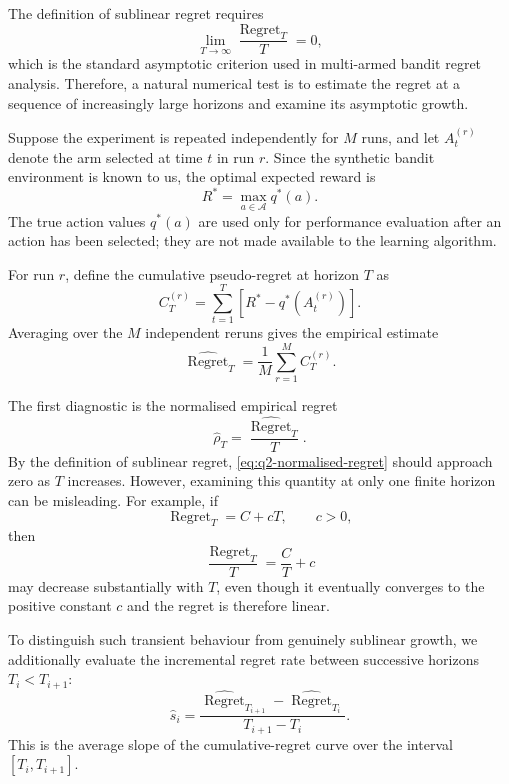 The definition of sublinear regret requires
\[
    \lim_{T\to\infty}
    \frac{\operatorname{Regret}_T}{T}
    =
    0,
\]
which is the standard asymptotic criterion used in multi-armed bandit
regret analysis. Therefore, a natural numerical
test is to estimate the regret at a sequence of increasingly large horizons
and examine its asymptotic growth.

Suppose the experiment is repeated independently for $M$ runs, and let
$A_t^{(r)}$ denote the arm selected at time $t$ in run $r$. Since the
synthetic bandit environment is known to us, the optimal expected reward is
\[
    R^\ast
    =
    \max_{a\in\mathcal A} q^\ast(a).
\]
The true action values $q^\ast(a)$ are used only for performance evaluation
after an action has been selected; they are not made available to the
learning algorithm.

For run $r$, define the cumulative pseudo-regret at horizon $T$ as
\[
    C_T^{(r)}
    =
    \sum_{t=1}^{T}
    \left[
        R^\ast-q^\ast\!\left(A_t^{(r)}\right)
    \right].
\]
Averaging over the $M$ independent reruns gives the empirical estimate
\[
    \widehat{\operatorname{Regret}}_T
    =
    \frac{1}{M}
    \sum_{r=1}^{M}
    C_T^{(r)}.
\]

The first diagnostic is the normalised empirical regret
\begin{equation}
    \widehat{\rho}_T
    =
    \frac{\widehat{\operatorname{Regret}}_T}{T}.
    \label{eq:q2-normalised-regret}
\end{equation}
By the definition of sublinear regret,
\eqref{eq:q2-normalised-regret} should approach zero as $T$ increases.
However, examining this quantity at only one finite horizon can be
misleading. For example, if
\[
    \operatorname{Regret}_T=C+cT,
    \qquad c>0,
\]
then
\[
    \frac{\operatorname{Regret}_T}{T}
    =
    \frac{C}{T}+c
\]
may decrease substantially with $T$, even though it eventually converges
to the positive constant $c$ and the regret is therefore linear.

To distinguish such transient behaviour from genuinely sublinear growth,
we additionally evaluate the incremental regret rate between successive
horizons $T_i<T_{i+1}$:
\begin{equation}
    \widehat{s}_i
    =
    \frac{
        \widehat{\operatorname{Regret}}_{T_{i+1}}
        -
        \widehat{\operatorname{Regret}}_{T_i}
    }{
        T_{i+1}-T_i
    }.
    \label{eq:q2-incremental-rate}
\end{equation}
This is the average slope of the cumulative-regret curve over the interval
$[T_i,T_{i+1}]$.

